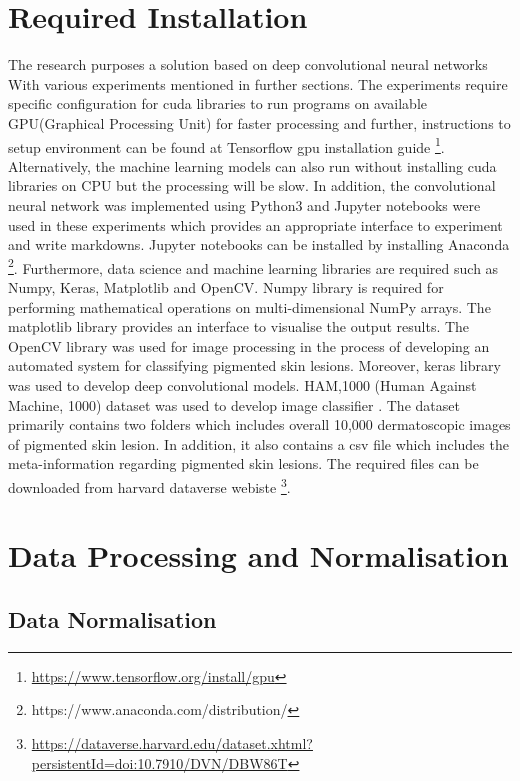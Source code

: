 \section{Required Installation}
The research purposes a solution based on deep convolutional neural networks
With various experiments mentioned in further sections.  The experiments
require specific configuration for cuda libraries to run programs on available GPU(Graphical Processing Unit) for faster processing
and further, instructions to setup environment can be found at Tensorflow gpu installation guide \footnote[1]{\url{https://www.tensorflow.org/install/gpu}}.
Alternatively, the machine learning models can also run without installing cuda libraries on CPU but the processing will be slow.
In addition, the convolutional neural network was implemented using Python3 and Jupyter notebooks were used in these experiments which provides an appropriate interface to experiment and write markdowns.  
Jupyter notebooks can be installed by installing Anaconda \footnote[2]{https://www.anaconda.com/distribution/}.
Furthermore, data science and machine learning libraries are required such as Numpy, Keras, Matplotlib and OpenCV. 
Numpy library is required for performing mathematical operations on multi-dimensional NumPy arrays. The matplotlib library provides an interface to visualise the output results. 
The OpenCV library was used for image processing in the process of developing an automated system for classifying
pigmented skin lesions. Moreover, keras library was used to develop deep convolutional models. 
HAM,1000 (Human Against Machine, 1000) dataset was used to develop image classifier \citep{DVN/DBW86T_2018}.
The dataset primarily contains two folders which includes overall 10,000 dermatoscopic images of pigmented skin lesion. In addition, it also contains a csv file which includes the meta-information regarding pigmented skin lesions.
The required files can be downloaded from harvard dataverse webiste \footnote[3]{\url{https://dataverse.harvard.edu/dataset.xhtml?persistentId=doi:10.7910/DVN/DBW86T}}.

\pagebreak
\section{Data Processing and Normalisation}

\subsection{Data Normalisation}

